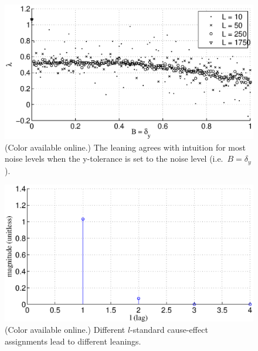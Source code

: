 \documentclass[a4paper,11pt,twocolumn]{article}
\begin{document}
\begin{figure}[ht]
\includegraphics[scale=0.45]{SimpleIRexample_Bxytol.eps}
\caption{(Color available online.) The leaning agrees with intuition for most noise levels when the y-tolerance is set to the noise level (i.e.\ $B=\delta_y$).}
\end{figure}
\begin{figure}[ht]
\includegraphics[scale=0.45]{SimpleIRexample_difflags.eps}
\caption{(Color available online.) Different $l$-standard cause-effect assignments lead to different leanings.}
\end{figure}
\end{document}
